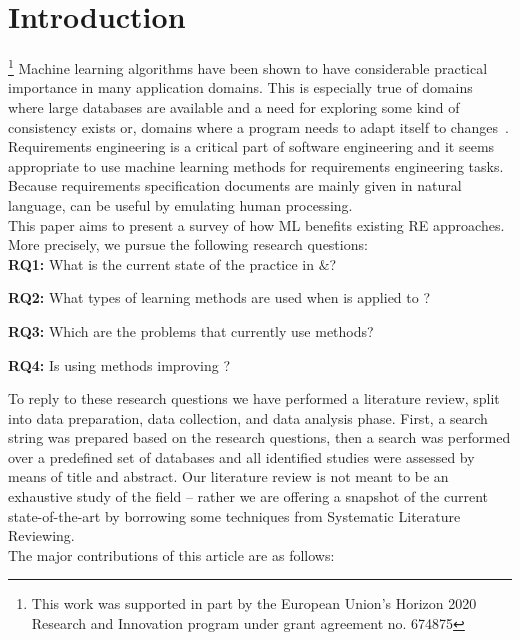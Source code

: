 \section{Introduction}

% 
% 
% 
% 
\footnote{This work was supported in part by the European Union’s Horizon 2020
Research and Innovation program under grant agreement no. 674875}
Machine learning algorithms have been shown to have considerable practical
importance in many application domains. This is especially true of domains where
large databases are available and a need for exploring some kind of consistency
exists or, domains where a program needs to adapt itself to
changes~\cite{Zhang2002}. Requirements engineering is a critical part of
software engineering and it seems appropriate to use machine learning methods
for requirements engineering tasks. Because requirements specification documents
are mainly given in natural language, \ML can be useful by emulating human
processing.
\\
This paper aims to present a survey of how ML benefits existing RE
approaches. More precisely, we pursue the following research questions: \\
\noindent
\textbf{RQ1:} What is the current state of the practice in \ML${\&}$\RE?

\noindent
\textbf{RQ2:} What types of learning methods are used when \ML is applied to
\RE?

\noindent
\textbf{RQ3:} Which are the \RE problems that currently use \ML methods?

\noindent
\textbf{RQ4:} Is using \ML methods improving \RE?

To reply to these research questions we have performed a literature review,
split into data preparation, data collection, and data analysis phase. First, a search string
was prepared based on the research questions, then a search was performed over a
predefined set of databases and all identified studies were assessed by means of
title and abstract. Our literature review is not meant to be an exhaustive study
of the field -- rather we are offering a snapshot of the current
state-of-the-art by borrowing some techniques from Systematic Literature
Reviewing.\\
The major contributions of this article are as follows:

